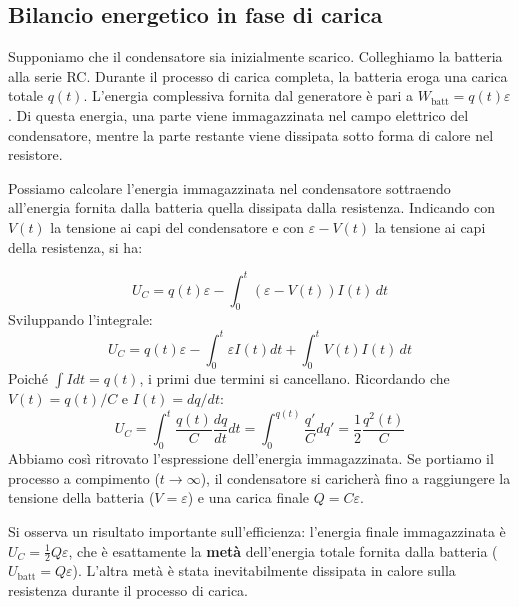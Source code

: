 \documentclass{book}
\begin{document}
\subsection*{Bilancio energetico in fase di carica}
Supponiamo che il condensatore sia inizialmente scarico. Colleghiamo la batteria alla serie RC. Durante il processo di carica completa, la batteria eroga una carica totale $q(t)$. L'energia complessiva fornita dal generatore è pari a $W_{\text{batt}} = q(t)\varepsilon$.
Di questa energia, una parte viene immagazzinata nel campo elettrico del condensatore, mentre la parte restante viene dissipata sotto forma di calore nel resistore.

Possiamo calcolare l'energia immagazzinata nel condensatore sottraendo all'energia fornita dalla batteria quella dissipata dalla resistenza. Indicando con $V(t)$ la tensione ai capi del condensatore e con $\varepsilon - V(t)$ la tensione ai capi della resistenza, si ha:

$$
U_C = q(t)\varepsilon - \int_0^t (\varepsilon - V(t)) I(t) \, dt
$$
Sviluppando l'integrale:
$$
U_C = q(t)\varepsilon - \int_0^t \varepsilon I(t) dt + \int_0^t V(t)I(t) \, dt
$$
Poiché $\int I dt = q(t)$, i primi due termini si cancellano. Ricordando che $V(t) = q(t)/C$ e $I(t) = dq/dt$:
$$
U_C = \int_0^t \frac{q(t)}{C} \frac{dq}{dt} dt = \int_0^{q(t)} \frac{q'}{C} dq' = \frac{1}{2}\frac{q^2(t)}{C}
$$
Abbiamo così ritrovato l'espressione dell'energia immagazzinata.
Se portiamo il processo a compimento ($t \to \infty$), il condensatore si caricherà fino a raggiungere la tensione della batteria ($V=\varepsilon$) e una carica finale $Q=C\varepsilon$.

Si osserva un risultato importante sull'efficienza: l'energia finale immagazzinata è $U_C = \frac{1}{2}Q\varepsilon$, che è esattamente la \textbf{metà} dell'energia totale fornita dalla batteria ($U_{\text{batt}} = Q\varepsilon$). L'altra metà è stata inevitabilmente dissipata in calore sulla resistenza durante il processo di carica.
\end{document}

